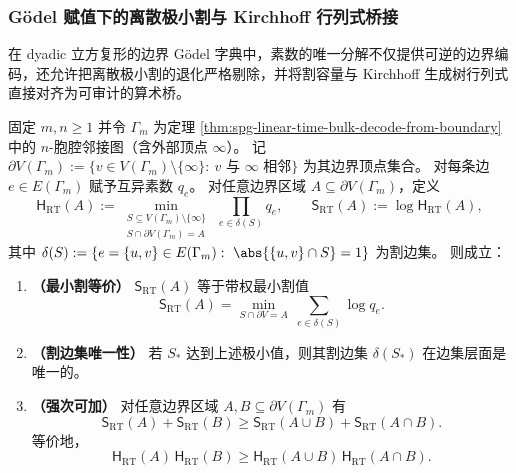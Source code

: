 
\subsubsection{Gödel 赋值下的离散极小割与 Kirchhoff 行列式桥接}\label{subsubsec:spg-godel-rt-mincut-kirchhoff-bridge}

在 dyadic 立方复形的边界 Gödel 字典中，素数的唯一分解不仅提供可逆的边界编码，还允许把离散极小割的退化严格剔除，并将割容量与 Kirchhoff 生成树行列式直接对齐为可审计的算术桥。

\begin{theorem}\label{thm:spg-godel-rt-mincut-uniqueness-ssa}
固定 \(m,n\ge 1\) 并令 \(\Gamma_m\) 为定理 \ref{thm:spg-linear-time-bulk-decode-from-boundary} 中的 \(n\)-胞腔邻接图（含外部顶点 \(\infty\)）。
记 \(\partial V(\Gamma_m):=\{v\in V(\Gamma_m)\setminus\{\infty\}:\ v\text{ 与 }\infty\text{ 相邻}\}\) 为其边界顶点集合。
对每条边 \(e\in E(\Gamma_m)\) 赋予互异素数 \(q_e\)。
对任意边界区域 \(A\subseteq \partial V(\Gamma_m)\)，定义
\[
\mathsf H_{\mathrm{RT}}(A)
:=\min_{\substack{S\subseteq V(\Gamma_m)\setminus\{\infty\}\\ S\cap \partial V(\Gamma_m)=A}}
\ \prod_{e\in\delta(S)} q_e,
\qquad
\mathsf S_{\mathrm{RT}}(A):=\log \mathsf H_{\mathrm{RT}}(A),
\]
其中 \(\delta(S):=\{e=\{u,v\}\in E(\Gamma_m):\ \abs{\{u,v\}\cap S}=1\}\) 为割边集。
则成立：
\begin{enumerate}
  \item \textbf{（最小割等价）} \(\mathsf S_{\mathrm{RT}}(A)\) 等于带权最小割值
        \[
        \mathsf S_{\mathrm{RT}}(A)
        =\min_{S\cap\partial V=A}\ \sum_{e\in\delta(S)}\log q_e.
        \]
  \item \textbf{（割边集唯一性）} 若 \(S_\ast\) 达到上述极小值，则其割边集 \(\delta(S_\ast)\) 在边集层面是唯一的。
  \item \textbf{（强次可加）} 对任意边界区域 \(A,B\subseteq \partial V(\Gamma_m)\) 有
        \[
        \mathsf S_{\mathrm{RT}}(A)+\mathsf S_{\mathrm{RT}}(B)
        \ge \mathsf S_{\mathrm{RT}}(A\cup B)+\mathsf S_{\mathrm{RT}}(A\cap B).
        \]
        等价地，
        \[
        \mathsf H_{\mathrm{RT}}(A)\,\mathsf H_{\mathrm{RT}}(B)
        \ge
        \mathsf H_{\mathrm{RT}}(A\cup B)\,\mathsf H_{\mathrm{RT}}(A\cap B).
        \]
\end{enumerate}
\end{theorem}
